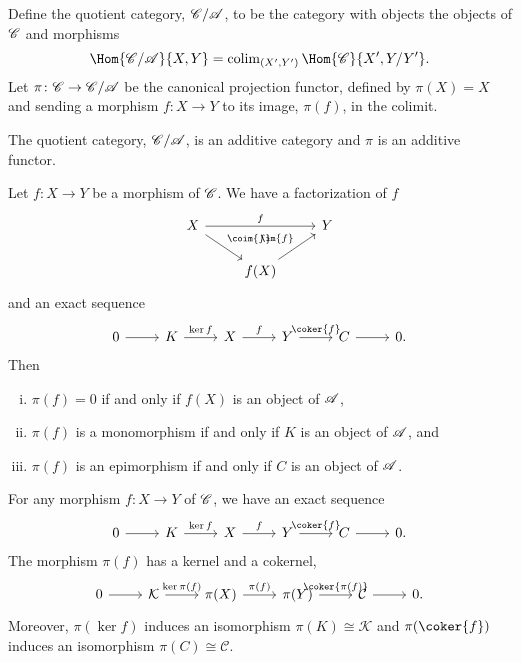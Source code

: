 \documentclass[10pt]{amsart}
\begin{document}
\begin{defn}
  Define the quotient category, $\mathscr{C}/\mathscr{A}$, to be the category with objects the objects of $\mathscr{C}$ and morphisms
  $$\Hom{\C/\A}{X, Y} = \operatorname{colim}_{(X^\prime, Y^\prime)} \Hom{\C}{X^\prime, Y/Y^\prime}.$$
  Let $\pi \colon \mathscr{C} \rightarrow \mathscr{C}/\mathscr{A}$ be the canonical projection functor, defined by $\pi(X) = X$ and sending a morphism $f \colon X \rightarrow Y$ to its image, $\pi(f)$, in the colimit.
\end{defn}

\begin{lem}
  The quotient category, $\mathscr{C}/\mathscr{A}$, is an additive category and $\pi$ is an additive functor.
\end{lem}

\begin{lem}
  Let $f \colon X \rightarrow Y$ be a morphism of $\mathscr{C}$.  
  We have a factorization of $f$
  $$\begin{tikzcd}
    X \arrow{rd}{\coim{f}}\arrow{rr}{f} & & Y\\
    & f(X)\arrow{ur}{\im{f}} & 
  \end{tikzcd}$$
  and an exact sequence 
  $$\begin{tikzcd}
    0 \arrow{r} & K \arrow{r}{\ker{f}} & X \arrow{r}{f} & Y \arrow{r}{\coker{f}} & C \arrow{r} & 0.
  \end{tikzcd}$$
  Then
  \begin{enumerate}[(i)]
    \item
      $\pi(f) = 0$ if and only if $f(X)$ is an object of $\mathscr{A}$,
    \item
      $\pi(f)$ is a monomorphism if and only if $K$ is an object of $\mathscr{A}$, and
    \item
      $\pi(f)$ is an epimorphism if and only if $C$ is an object of $\mathscr{A}$.
  \end{enumerate}
\end{lem}

\begin{lem}
  For any morphism $f \colon X \rightarrow Y$ of $\mathscr{C}$, we have an exact sequence 
  $$\begin{tikzcd}
    0 \arrow{r} & K \arrow{r}{\ker{f}} & X \arrow{r}{f} & Y \arrow{r}{\coker{f}} & C \arrow{r} & 0.
  \end{tikzcd}$$ 
  The morphism $\pi(f)$ has a kernel and a cokernel,
  $$\begin{tikzcd}
    0 \arrow{r} & \mathcal{K} \arrow{r}{\ker{\pi(f)}} & \pi(X) \arrow{r}{\pi(f)} & \pi(Y) \arrow{r}{\coker{\pi(f)}} & \mathcal{C} \arrow{r} & 0.
  \end{tikzcd}$$
  Moreover, $\pi(\ker{f})$ induces an isomorphism $\pi(K) \cong \mathcal{K}$ and $\pi(\coker{f})$ induces an isomorphism $\pi(C) \cong \mathcal{C}$.
\end{lem}
\end{document}
